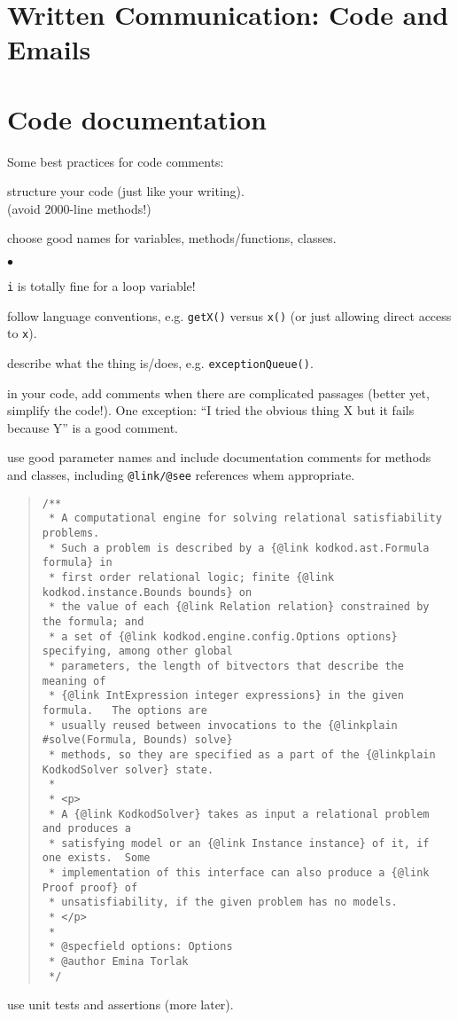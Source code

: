 \documentclass[11pt]{article}
\newcommand{\squishlist}{
 \begin{list}{$\bullet$}
  { \setlength{\itemsep}{0pt}
     \setlength{\parsep}{3pt}
     \setlength{\topsep}{3pt}
     \setlength{\partopsep}{0pt}
     \setlength{\leftmargin}{1.5em}
     \setlength{\labelwidth}{1em}
     \setlength{\labelsep}{0.5em} } }
\newcommand{\squishend}{
  \end{list}  }
\begin{document}
\newpage
\section*{Written Communication: Code and Emails}

\section*{Code documentation}
Some best practices for code comments:
\begin{enumerate}
\item structure your code (just like your writing).\\
(avoid 2000-line methods!)
\item choose good names for variables, methods/functions, classes.
\squishlist
\item {\tt i} is totally fine for a loop variable!
\item follow language conventions, e.g. {\tt getX()} versus {\tt x()} (or just allowing direct access to {\tt x}).
\item describe what the thing is/does, e.g. {\tt exceptionQueue()}.
\squishend
\item in your code, add comments when there are complicated passages (better yet, simplify the code!). One exception: ``I tried the obvious thing X but it fails because Y'' is a good comment.
\item use good parameter names and include documentation comments for methods and classes, including \verb+@link/@see+ references whem appropriate.
{\small 
\begin{quote}
\begin{verbatim}
/** 
 * A computational engine for solving relational satisfiability problems. 
 * Such a problem is described by a {@link kodkod.ast.Formula formula} in 
 * first order relational logic; finite {@link kodkod.instance.Bounds bounds} on 
 * the value of each {@link Relation relation} constrained by the formula; and 
 * a set of {@link kodkod.engine.config.Options options} specifying, among other global 
 * parameters, the length of bitvectors that describe the meaning of 
 * {@link IntExpression integer expressions} in the given formula.   The options are 
 * usually reused between invocations to the {@linkplain #solve(Formula, Bounds) solve}
 * methods, so they are specified as a part of the {@linkplain KodkodSolver solver} state. 
 * 
 * <p>
 * A {@link KodkodSolver} takes as input a relational problem and produces a 
 * satisfying model or an {@link Instance instance} of it, if one exists.  Some 
 * implementation of this interface can also produce a {@link Proof proof} of 
 * unsatisfiability, if the given problem has no models.
 * </p>
 * 
 * @specfield options: Options 
 * @author Emina Torlak 
 */
\end{verbatim}
\end{quote}
}
\item use unit tests and assertions (more later).
\end{enumerate}
\end{document}
